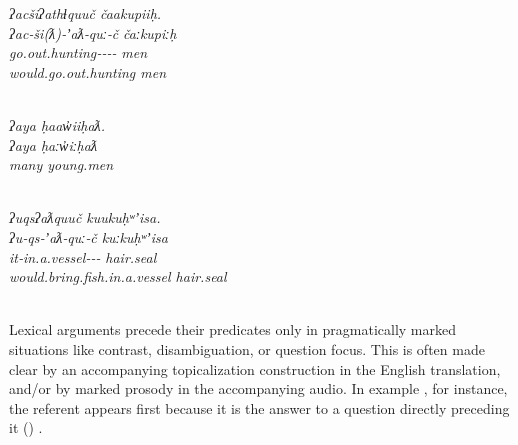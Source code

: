 \begin{exe}
  \ex\label{ex:3.8}
  \begin{xlist}

    \ex\label{ex:3.8a}
    \glllll \em{ʔacšiʔathɬquuč}                                          čaakupiiḥ.\\
            \em{ʔac‑ši(ƛ)‑ʼaƛ‑quː‑č}                                     čaːkupiːḥ\\
            \em{go.out.hunting‑‑‑‑} men\\
            \em{would.go.out.hunting}                                    men\\
            \em{}                                               \\

    \ex\label{ex:3.8b}
    \gllll \em{ʔaya}      ḥaaw̓iiḥaƛ.\\
           \em{ʔaya}      ḥaːw̓iːḥaƛ\\
           \em{many}      young.men\\
           \em{} \\

    \ex\label{ex:3.8c}
    \glllll \em{ʔuqsʔaƛquuč}                                    kuukuḥʷʼisa.\\
            \em{ʔu‑qs‑ʼaƛ‑quː‑č}                                kuːkuḥʷʼisa\\
            \em{it‑in.a.vessel‑‑‑} hair.seal\\
            \em{would.bring.fish.in.a.vessel}                   hair.seal\\
            \em{}                                      \\

  \end{xlist}
\end{exe}

\noindent Lexical arguments precede their predicates only in pragmatically marked situations like contrast, disambiguation, or question focus. This is often made clear by an accompanying topicalization construction in the English translation, and/or by marked prosody in the accompanying audio. In example , for instance, the referent appears first because it is the answer to a question directly preceding it () \parencite[149]{Nakayama2001}.

